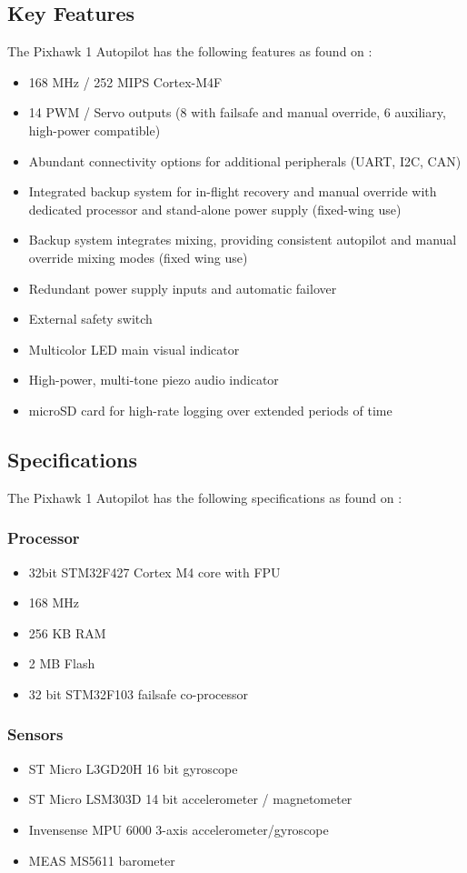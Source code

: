 \subsection{Key Features}
The Pixhawk 1 Autopilot has the following features as found on \cite{apm_org}:
\begin{itemize}
\item 168 MHz / 252 MIPS Cortex-M4F
\item 14 PWM / Servo outputs (8 with failsafe and manual override, 6 auxiliary, high-power compatible)
\item Abundant connectivity options for additional peripherals (UART, I2C, CAN)
\item Integrated backup system for in-flight recovery and manual override with dedicated processor and stand-alone power supply (fixed-wing use)
\item Backup system integrates mixing, providing consistent autopilot and manual override mixing modes (fixed wing use)
\item Redundant power supply inputs and automatic failover
\item External safety switch
\item Multicolor LED main visual indicator
\item High-power, multi-tone piezo audio indicator
\item microSD card for high-rate logging over extended periods of time
\end{itemize}

\subsection{Specifications}
The Pixhawk 1 Autopilot has the following specifications as found on \cite{apm_org}:
\subsubsection{Processor}
\begin{itemize}
\item 32bit STM32F427 Cortex M4 core with FPU
\item 168 MHz
\item 256 KB RAM
\item 2 MB Flash
\item 32 bit STM32F103 failsafe co-processor
\end{itemize}
\subsubsection{Sensors}
\begin{itemize}
\item ST Micro L3GD20H 16 bit gyroscope
\item ST Micro LSM303D 14 bit accelerometer / magnetometer
\item Invensense MPU 6000 3-axis accelerometer/gyroscope
\item MEAS MS5611 barometer
\end{itemize}
